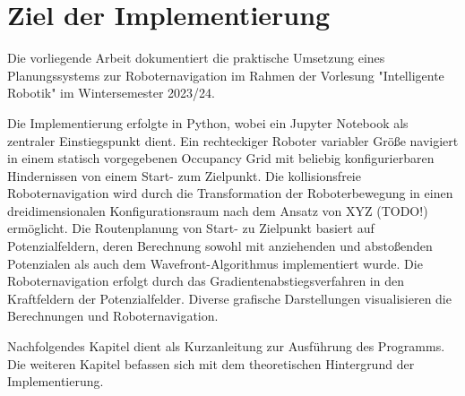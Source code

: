 \chapter{Ziel der Implementierung}

Die vorliegende Arbeit dokumentiert die praktische Umsetzung eines Planungssystems zur Roboternavigation im Rahmen der Vorlesung "Intelligente Robotik" im Wintersemester 2023/24.

Die Implementierung erfolgte in Python, wobei ein Jupyter Notebook als zentraler Einstiegspunkt dient. 
Ein rechteckiger Roboter variabler Größe navigiert in einem statisch vorgegebenen Occupancy Grid mit beliebig konfigurierbaren Hindernissen von einem Start- zum Zielpunkt.
Die kollisionsfreie Roboternavigation wird durch die Transformation der Roboterbewegung in einen dreidimensionalen Konfigurationsraum nach dem Ansatz von XYZ (TODO!) ermöglicht. 
Die Routenplanung von Start- zu Zielpunkt basiert auf Potenzialfeldern, deren Berechnung sowohl mit anziehenden und abstoßenden Potenzialen als auch dem Wavefront-Algorithmus implementiert wurde. 
Die Roboternavigation erfolgt durch das Gradientenabstiegsverfahren in den Kraftfeldern der Potenzialfelder. 
Diverse grafische Darstellungen visualisieren die Berechnungen und Roboternavigation.

Nachfolgendes Kapitel dient als Kurzanleitung zur Ausführung des Programms. Die weiteren Kapitel befassen sich mit dem theoretischen Hintergrund der Implementierung.

%
